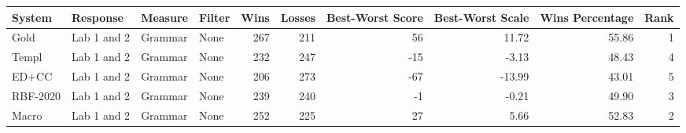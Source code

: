 \begin{tabular}{llllrrrrrr}
\toprule
System & Response & Measure & Filter & Wins & Losses & Best-Worst Score & Best-Worst Scale & Wins Percentage & Rank \\
\midrule
Gold & Lab 1 and 2 & Grammar & None & 267 & 211 & 56 & 11.72 & 55.86 & 1 \\
Templ & Lab 1 and 2 & Grammar & None & 232 & 247 & -15 & -3.13 & 48.43 & 4 \\
ED+CC & Lab 1 and 2 & Grammar & None & 206 & 273 & -67 & -13.99 & 43.01 & 5 \\
RBF-2020 & Lab 1 and 2 & Grammar & None & 239 & 240 & -1 & -0.21 & 49.90 & 3 \\
Macro & Lab 1 and 2 & Grammar & None & 252 & 225 & 27 & 5.66 & 52.83 & 2 \\
\bottomrule
\end{tabular}
